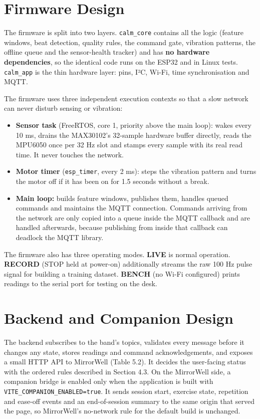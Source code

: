 \documentclass[12pt,letterpaper,oneside]{report}
\begin{document}
\section{Firmware Design}\label{sec:3.5}

The firmware is split into two layers. \texttt{calm\_\allowbreak{}core} contains all the logic (feature windows, beat detection, quality rules, the command gate, vibration patterns, the offline queue and the sensor-health tracker) and has \textbf{no hardware dependencies}, so the identical code runs on the ESP32 and in Linux tests. \texttt{calm\_\allowbreak{}app} is the thin hardware layer: pins, I²C, Wi-Fi, time synchronisation and MQTT.


The firmware uses three independent execution contexts so that a slow network can never disturb sensing or vibration:


\begin{itemize}\item \textbf{Sensor task} (FreeRTOS, core 1, priority above the main loop): wakes every 10 ms, drains the MAX30102's 32-sample hardware buffer directly, reads the MPU6050 once per 32 Hz slot and stamps every sample with its real read time. It never touches the network.
\item \textbf{Motor timer} (\texttt{esp\_\allowbreak{}timer}, every 2 ms): steps the vibration pattern and turns the motor off if it has been on for 1.5 seconds without a break.
\item \textbf{Main loop:} builds feature windows, publishes them, handles queued commands and maintains the MQTT connection. Commands arriving from the network are only copied into a queue inside the MQTT callback and are handled afterwards, because publishing from inside that callback can deadlock the MQTT library.
\end{itemize}

The firmware also has three operating modes. \textbf{LIVE} is normal operation. \textbf{RECORD} (STOP held at power-on) additionally streams the raw 100 Hz pulse signal for building a training dataset. \textbf{BENCH} (no Wi-Fi configured) prints readings to the serial port for testing on the desk.


\section{Backend and Companion Design}\label{sec:3.6}

The backend subscribes to the band's topics, validates every message before it changes any state, stores readings and command acknowledgements, and exposes a small HTTP API to MirrorWell (Table 5.2). It decides the user-facing status with the ordered rules described in Section 4.3. On the MirrorWell side, a companion bridge is enabled only when the application is built with \texttt{VITE\_\allowbreak{}COMPANION\_\allowbreak{}ENABLED=true}. It sends session start, exercise state, repetition and ease-off events and an end-of-session summary to the same origin that served the page, so MirrorWell's no-network rule for the default build is unchanged.
\end{document}
